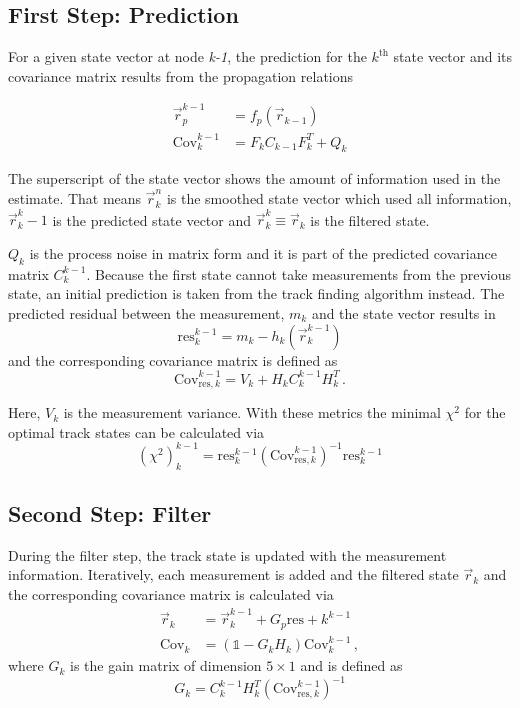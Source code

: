 \subsection{First Step: Prediction}
For a given state vector at node \textit{k-1}, the prediction for the $k^{\text{th}}$ state vector and its covariance matrix results from the propagation relations

\begin{align*}
  \vec{r}_p^{k-1} &= f_p\left( \vec{r}_{k-1} \right) \\
  \text{Cov}_k^{k-1} &= F_k C_{k-1} F_k^T + Q_k
\end{align*}

The superscript of the state vector shows the amount of information used in the estimate.
That means $\vec{r}_k^n$ is the smoothed state vector which used all information,
$\vec{r}_k^k-1$ is the predicted state vector and $\vec{r}_k^k \equiv \vec{r}_k$ is the filtered state.

$Q_k$ is the process noise in matrix form and it is part of the predicted
covariance matrix $C_k^{k-1}$.
Because the first state cannot take measurements from the previous state, an initial prediction is taken from the track finding algorithm instead.
The predicted residual between the measurement, $m_k$ and the state vector results in
\begin{equation*}
  \text{res}_k^{k-1} = m_k - h_k\left( \vec{r}_k^{k-1} \right)
\end{equation*}
and the corresponding covariance matrix is defined as
\begin{equation*}
  \text{Cov}_{\text{res},k}^{k-1} = V_k + H_k C_k^{k-1} H_k^T\,.
\end{equation*}

Here, $V_k$ is the measurement variance. With these metrics the minimal $\chi^2$ for the optimal track states can be calculated via
\begin{equation*}
  \left( \chi^2 \right)_k^{k-1} =
  \text{res}_k^{k-1} \left(\text{Cov}_{\text{res},k}^{k-1}\right)^{-1} \text{res}_k^{k-1}
\end{equation*}

\subsection{Second Step: Filter}
During the filter step, the track state is updated with the measurement information.
Iteratively, each measurement is added and the filtered state $\vec{r}_k$ and the corresponding covariance matrix is calculated via
\begin{align*}
  \vec{r}_k &= \vec{r}_k^{k-1} + G_p \text{res}+k^{k-1} \\
  \text{Cov}_k &= \left(\mathbb{1} - G_k H_k\right) \text{Cov}_k^{k-1}\,,
\end{align*}
where $G_k$ is the gain matrix of dimension $5\times1$ and is defined as
\begin{equation*}
  G_k = C_k^{k-1} H_k^T \left( \text{Cov}_{\text{res},k}^{k-1} \right)^{-1}
\end{equation*}

